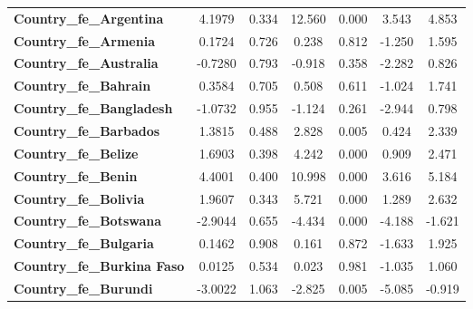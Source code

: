\begin{center}
\begin{tabular}{lcccccc}
\textbf{Country\_fe\_Argentina}                      &       4.1979  &        0.334     &    12.560  &         0.000        &        3.543    &        4.853     \\
\textbf{Country\_fe\_Armenia}                        &       0.1724  &        0.726     &     0.238  &         0.812        &       -1.250    &        1.595     \\
\textbf{Country\_fe\_Australia}                      &      -0.7280  &        0.793     &    -0.918  &         0.358        &       -2.282    &        0.826     \\
\textbf{Country\_fe\_Bahrain}                        &       0.3584  &        0.705     &     0.508  &         0.611        &       -1.024    &        1.741     \\
\textbf{Country\_fe\_Bangladesh}                     &      -1.0732  &        0.955     &    -1.124  &         0.261        &       -2.944    &        0.798     \\
\textbf{Country\_fe\_Barbados}                       &       1.3815  &        0.488     &     2.828  &         0.005        &        0.424    &        2.339     \\
\textbf{Country\_fe\_Belize}                         &       1.6903  &        0.398     &     4.242  &         0.000        &        0.909    &        2.471     \\
\textbf{Country\_fe\_Benin}                          &       4.4001  &        0.400     &    10.998  &         0.000        &        3.616    &        5.184     \\
\textbf{Country\_fe\_Bolivia}                        &       1.9607  &        0.343     &     5.721  &         0.000        &        1.289    &        2.632     \\
\textbf{Country\_fe\_Botswana}                       &      -2.9044  &        0.655     &    -4.434  &         0.000        &       -4.188    &       -1.621     \\
\textbf{Country\_fe\_Bulgaria}                       &       0.1462  &        0.908     &     0.161  &         0.872        &       -1.633    &        1.925     \\
\textbf{Country\_fe\_Burkina Faso}                   &       0.0125  &        0.534     &     0.023  &         0.981        &       -1.035    &        1.060     \\
\textbf{Country\_fe\_Burundi}                        &      -3.0022  &        1.063     &    -2.825  &         0.005        &       -5.085    &       -0.919     \\

\end{tabular}
\end{center}
